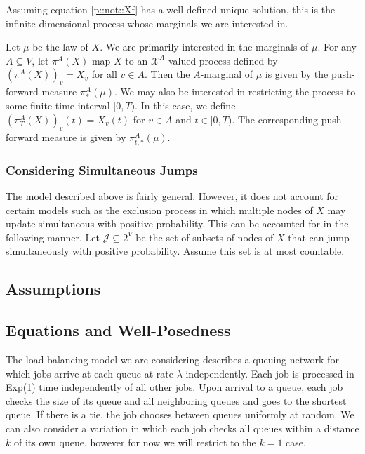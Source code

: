 \documentclass[12pt]{article}
\newcommand{\mc}{\mathcal}
\newcommand{\ind}{\hspace{24pt}}
\newcommand{\sta}{\mc{X}}							%
\newcommand{\Xf}{X}									%
\newcommand{\m}{\mu}								%
\newcommand{\proj}{\pi}								%
\newcommand{\vind}[1]{_{#1}}						%
\newcommand{\tme}[1]{(#1)}							%
\newcommand{\vpara}[1]{^{#1}}						%
\newcommand{\tpara}[1]{_{#1}}						%
\newcommand{\psf}{_*}								%
\newcommand{\tparapsf}[1]{_{#1,*}}					%
\newcommand{\Jmps}{\mc{J}}							%
\newcommand{\arr}{\lambda}							%
\begin{document}
Assuming equation \eqref{p::not::Xf} has a well-defined unique solution, this is the infinite-dimensional process whose marginals we are interested in.

\ind Let \(\m\) be the law of \(\Xf\). We are primarily interested in the marginals of \(\m\). For any \(A \subseteq V\), let \(\proj\vpara{A}(\Xf)\) map \(\Xf\) to an \(\sta^A\)-valued process defined by \((\proj\vpara{A}(\Xf))\vind{v} = \Xf\vind{v}\) for all \(v\in A\). Then the \(A\)-marginal of \(\m\) is given by the push-forward measure \(\proj\vpara{A}\psf(\m)\). We may also be interested in restricting the process to some finite time interval \([0,T)\). In this case, we define \((\proj\vpara{A}\tpara{T}(\Xf))\vind{v}\tme{t} = \Xf\vind{v}\tme{t}\) for \(v \in A\) and \(t \in [0,T)\). The corresponding push-forward measure is given by \(\proj\vpara{A}\tparapsf{t}(\m)\).

\subsubsection{Considering Simultaneous Jumps}

The model described above is fairly general. However, it does not account for certain models such as the exclusion process in which multiple nodes of \(\Xf\) may update simultaneous with positive probability. This can be accounted for in the following manner. Let \(\Jmps \subseteq 2^V\) be the set of subsets of nodes of \(\Xf\) that can jump simultaneously with positive probability. Assume this set is at most countable.

\subsection{Assumptions}
\label{a::not}




\subsection{Equations and Well-Posedness}




\ind The load balancing model we are considering describes a queuing network for which jobs arrive at each queue at rate \(\arr\) independently. Each job is processed in Exp(1) time independently of all other jobs. Upon arrival to a queue, each job checks the size of its queue and all neighboring queues and goes to the shortest queue. If there is a tie, the job chooses between queues uniformly at random. We can also consider a variation in which each job checks all queues within a distance \(k\) of its own queue, however for now we will restrict to the \(k=1\) case.
\end{document}
